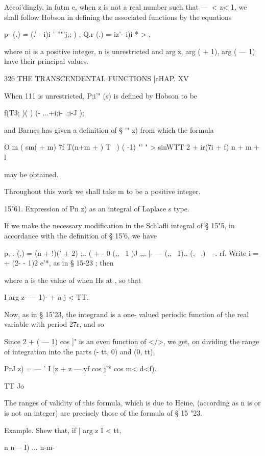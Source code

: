 {{{Accoi'dingly, in futm e, when z is not a real number such that —\ < z< 1, 
we shall follow Hobson in defining the associated functions by the equations 

p- (.) = (.' - i)i ' ''"'j;; ) , Q.r (.) = iz'- i)i *  > , 

where ni is a positive integer, n is unrestricted and arg z, arg (  + 1), arg (  — 1) 
have their principal values. 



326 THE TRANSCENDENTAL FUNCTIONS [cHAP. XV 

When 111 is unrestricted, P;i'" (s) is defined by Hobson to be 

f(T3; )( )  (- ...+i;i- .;i-J ); 

and Barnes has given a definition of § '"  z) from which the formula 

O m (   sm(  + m) 7f T(n+m +  ) T \ ) ( -1) "' 
 "  > sinWTT 2  + ir(7i + f)  n + m + l 

may be obtained. 

Throughout this work we shall take m to be a positive integer. 

15"61. Expression of Pn  z) as an integral of Laplace s type. 

If we make the necessary modification in the Schlafli integral of § 15"5, 
in accordance with the definition of § 15'6, we have 

p, . (,) = (n + !)('  + 2) ;.. (  + - 0 (,, \  1 )J ,,. |- --- (,, \  1).. (, \  ,)\  \  -. rf. 
Write i =   + (2- - 1)2 e'*, as in § 15-23 ; then 

where a is the value of   when Hs at   , so that 

I arg  z- — 1)- + a j < TT. 

Now, as in § 15'23, the integrand is a one- valued periodic function of the 
real variable   with period 27r, and so 

Since  2  + (   — 1)  cos ]" is an even function of </>, we get, on dividing 
the range of integration into the parts (- tt, 0) and (0, tt), 

PrJ   z) = — '   I [z +  z  — yf cos  j'* cos m<  d<f). 

TT Jo 

The ranges of validity of this formula, which is due to Heine, (according as 
n is or is not an integer) are precisely those of the formula of § 15 "23. 

Example. Shew that, if | arg z I <  tt, 

n n— I) ...  n-m- 



}}}
